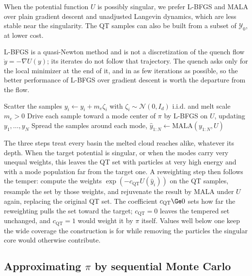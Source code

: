 \documentclass{article}
\begin{document}
When the potential function $U$ is possibly singular, we prefer L-BFGS and MALA over plain gradient descent and unadjusted Langevin dynamics, which are less stable near the singularity. The QT samples can also be built from a subset of $\mathcal Y_0$, at lower cost.

\begin{remark}
	L-BFGS is a quasi-Newton method \citep{liu1989limited} and is not a discretization of the quench flow $\dot y = -\nabla U(y)$; its iterates do not follow that trajectory. The quench asks only for the local minimizer at the end of it, and in as few iterations as possible, so the better performance of L-BFGS over gradient descent is worth the departure from the flow.
\end{remark}

\begin{algorithm}[htb]
\caption{QT: wide-coverage construction}
\label{alg: QT}
Scatter the samples $y_i \gets y_i + m_e\zeta_i$ with $\zeta_i \sim \mathcal N(0, I_d)$ i.i.d. and melt scale $m_e > 0$\;
Drive each sample toward a mode center of $\pi$ by L-BFGS on $U$, updating $y_1,\dots,y_N$\;
Spread the samples around each mode, $\hat y_{1:N} \gets \mathrm{MALA}(y_{1:N}, U)$\;
\end{algorithm}

The three steps treat every basin the melted cloud reaches alike, whatever its depth. When the target potential is singular, or when the modes carry very unequal weights, this leaves the QT set with particles at very high energy and with a mode population far from the target one. A reweighting step then follows the temper: compute the weights $\exp(-c_{\mathrm{QT}}U(\hat y_i))$ on the QT samples, resample the set by those weights, and rejuvenate the result by MALA under $U$ again, replacing the original QT set. The coefficient $c_{\mathrm{QT}}\Ge0$ sets how far the reweighting pulls the set toward the target; $c_{\mathrm{QT}}=0$ leaves the tempered set unchanged, and $c_{\mathrm{QT}}=1$ would weight it by $\pi$ itself. Values well below one keep the wide coverage the construction is for while removing the particles the singular core would otherwise contribute.

\subsection{Approximating $\pi$ by sequential Monte Carlo}
\label{subsec: annealing}
\end{document}
